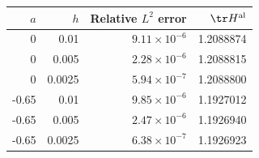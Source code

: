 \begin{tabular}{rrrr}
\toprule
$a$ & $h$ & Relative $L^2$ error & $\tr H^{\rm al}$\\
\midrule
0 & 0.01 & $9.11\times10^{-6}$ & 1.2088874 \\
0 & 0.005 & $2.28\times10^{-6}$ & 1.2088815 \\
0 & 0.0025 & $5.94\times10^{-7}$ & 1.2088800 \\
-0.65 & 0.01 & $9.85\times10^{-6}$ & 1.1927012 \\
-0.65 & 0.005 & $2.47\times10^{-6}$ & 1.1926940 \\
-0.65 & 0.0025 & $6.38\times10^{-7}$ & 1.1926923 \\
\bottomrule
\end{tabular}
